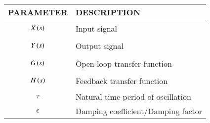 \begin{tabular}{|p{3cm}|p{5cm}|}
    \hline
    PARAMETER & DESCRIPTION   \\ \hline
    $$X\left(s\right)$$ & Input signal  \\ \hline
    $$Y\left(s\right)$$ & Output signal \\ \hline
    $$G\left(s\right)$$ & Open loop transfer function    \\ \hline
    $$H\left(s\right)$$ & Feedback transfer function    \\ \hline
    $$\tau$$ & Natural time period of oscillation  \\ \hline
    $$\epsilon$$ & Damping coefficient/Damping factor  \\ \hline
    \end{tabular}
